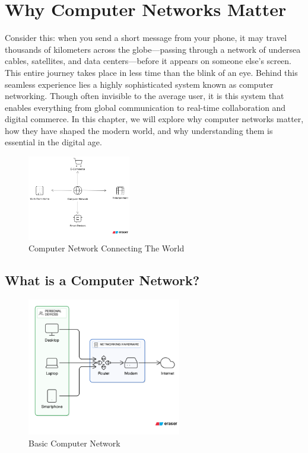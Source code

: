 \chapter{Why Computer Networks Matter}

Consider this: when you send a short message from your phone, it may travel thousands of kilometers across the globe—passing through a network of undersea cables, satellites, and data centers—before it appears on someone else’s screen. This entire journey takes place in less time than the blink of an eye. Behind this seamless experience lies a highly sophisticated system known as computer networking. Though often invisible to the average user, it is this system that enables everything from global communication to real-time collaboration and digital commerce. In this chapter, we will explore why computer networks matter, how they have shaped the modern world, and why understanding them is essential in the digital age.

\begin{figure}[H]
    \centering
    \includegraphics[width=0.4\textwidth]{images/chapter1/fig1.png}
    \caption{Computer Network Connecting The World}
    \label{fig:why-cn-matters}
\end{figure}

\section{What is a Computer Network?}

\begin{figure}[H]
    \centering
    \includegraphics[width=0.6\textwidth]{images/chapter1/fig2.png}
    \caption{Basic Computer Network}
    \label{fig:basic-cn}
\end{figure}

